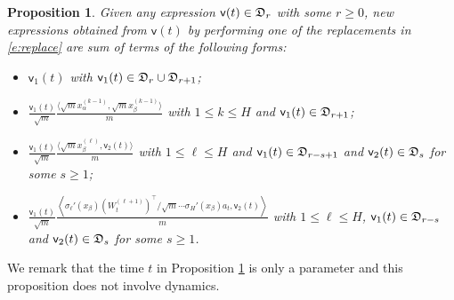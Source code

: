 \documentclass{article}
\numberwithin{equation}{section}
\newcommand{\fD}{{\frak D}}
\newcommand{\sff}{{\mathsf f}}
\newcommand{\sfv}{{\mathsf v}}
\newcommand{\al}{\alpha}
\renewcommand{\leq}{\leqslant}
\renewcommand{\geq}{\geqslant}
\newcommand{\1}{\mathds{1}}
\theoremstyle{plain} %
\newtheorem{proposition}[theorem]{Proposition}
\begin{document}
\begin{proposition}\label{p:fDstruc}
Given any expression $\sfv(t)\in \fD_r$ with some $r\geq 0$, new expressions obtained from $\sfv(t)$ by performing one of the replacements in \eqref{e:replace} are sum of terms of the following forms:
\begin{itemize}
\item $\sfv_1(t)$ with $\sfv_1(t)\in \fD_{r}\cup \fD_{r+1}$;
\item $  \frac { \sfv_1(t)} {\sqrt m}  \frac { \langle \sqrt m x_{\al}^{(k-1)},\sqrt m x_{\beta}^{(k-1)}\rangle} m
$ with $1\leq k\leq H$ and $\sfv_1(t)\in \fD_{r+1}$;
\item $ \frac { \sfv_1(t)} { \sqrt m} \frac {  \langle \sqrt m x_{\beta}^{(\ell)}, \sfv_2(t)\rangle} m$ with $1\leq \ell \leq H$ and $\sfv_1(t)\in \fD_{r-s+1}$ and $\sfv_2(t)\in \fD_{s}$ for some $s\geq 1$;
\item $\frac { \sfv_1(t)} { \sqrt m} \frac {  \left\langle \sigma_\ell'(x_{\beta}) (W_t^{(\ell+1)})^\top/\sqrt m \cdots 
\sigma_H' (x_{\beta})a_t, \sfv_2(t)\right\rangle} m$ with $1\leq \ell \leq H$, $\sfv_1(t)\in \fD_{r-s}$ and $\sfv_2(t)\in \fD_{s}$ for some $s\geq 1$.
\end{itemize}
\end{proposition}
We remark that the time $t$ in Proposition \ref{p:fDstruc}  is only a parameter and this proposition does not involve dynamics.  
\end{document}
